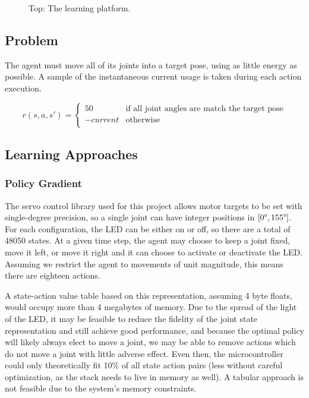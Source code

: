 \documentclass{article}
\begin{document}
\begin{figure}
	\centering
	\caption{Top: The learning platform.}
	\label{fig:platform}
\end{figure}


\subsection{Problem}

The agent must move all of its joints into a target pose, using as little energy as possible. A sample of the instantaneous current usage is taken during each action execution.

\[ r(s,a,s') =  \left\{
\begin{array}{ll}
	50 & \text{if all joint angles are match the target pose} \\
	-current & \text{otherwise} \\
\end{array} 
\right. \]


\subsection{Learning Approaches}

\subsubsection{Policy Gradient}



The servo control library used for this project allows motor targets to be set with single-degree precision, so a single joint can have integer positions in  $[0\degree, 155\degree]$. For each configuration, the LED can be either on or off, so there are a total of 48050 states. At a given time step, the agent may choose to keep a joint fixed, move it left, or move it right and it can choose to activate or deactivate the LED. Assuming we restrict the agent to movements of unit magnitude, this means there are eighteen actions.

A state-action value table based on this representation, assuming 4 byte floats, would occupy more than 4 megabytes of memory. Due to the spread of the light of the LED, it may be feasible to reduce the fidelity of the joint state representation and still achieve good performance, and because the optimal policy will likely always elect to move a joint, we may be able to remove actions which do not move a joint with little adverse effect. Even then, the microcontroller could only theoretically fit 10\% of all state action pairs (less without careful optimization, as the stack needs to live in memory as well). A tabular approach is not feasible due to the system's memory constraints.
\end{document}
